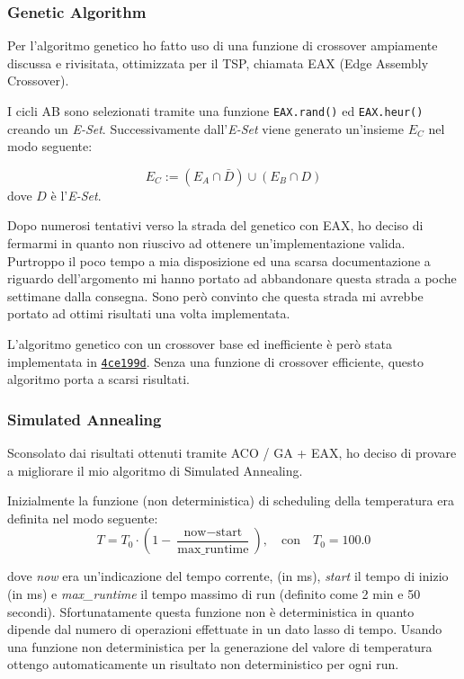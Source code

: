 \documentclass{article}
\newcommand{\mvar}[1]{\textrm{\textit{#1}}}
\newcommand{\ic}[1]{\texttt{#1}}
\begin{document}
\subsubsection{Genetic Algorithm}
Per l'algoritmo genetico ho fatto uso di una funzione di crossover ampiamente
discussa e rivisitata, ottimizzata per il TSP, chiamata EAX (Edge Assembly
Crossover).

I cicli AB sono selezionati tramite una funzione \ic{EAX.rand()} ed
\ic{EAX.heur()} creando un \mvar{E-Set}.
Successivamente dall'\mvar{E-Set} viene generato un'insieme $E_C$ nel modo seguente:

\begin{equation}
    E_C := (E_A \cap \bar{D}) \cup (E_B \cap D)
\end{equation}
dove $D$ è l'\mvar{E-Set}.

Dopo numerosi tentativi verso la strada del genetico con EAX, ho deciso di
fermarmi in quanto non riuscivo ad ottenere un'implementazione valida.
Purtroppo il poco tempo a mia disposizione ed una scarsa documentazione a riguardo
dell'argomento mi hanno portato ad abbandonare questa strada a poche settimane dalla
consegna. Sono però convinto che questa strada mi avrebbe portato
ad ottimi risultati una volta implementata.

L'algoritmo genetico con un crossover base ed inefficiente è però stata implementata
in \href{https://github.com/denysvitali/tsp-cup-2019/tree/4ce199dcb53d31f20663dbe6c4eaf4bffd1222de}{\texttt{4ce199d}}.
Senza una funzione di crossover efficiente, questo algoritmo porta a scarsi risultati.
\subsubsection{Simulated Annealing}
Sconsolato dai risultati ottenuti tramite ACO / GA + EAX, ho deciso di provare a migliorare
il mio algoritmo di Simulated Annealing.

Inizialmente la funzione (non deterministica) di scheduling della temperatura
era definita nel modo seguente:
\begin{equation}
    T = T_0 \cdot (1 - \dfrac{\text{now} - \text{start}}{\text{max\_runtime}})
    , \quad \text{con} \quad T_0 = 100.0
\end{equation}

dove \textit{now} era un'indicazione del tempo corrente,
(in ms), \textit{start} il tempo di inizio (in ms) e \textit{max\_runtime}
il tempo massimo di run (definito come 2 min e 50 secondi).
Sfortunatamente questa funzione non è deterministica in quanto dipende dal numero
di operazioni effettuate in un dato lasso di tempo.
Usando una funzione non deterministica per la generazione del valore di temperatura
ottengo automaticamente un risultato non deterministico per ogni run.
\end{document}
